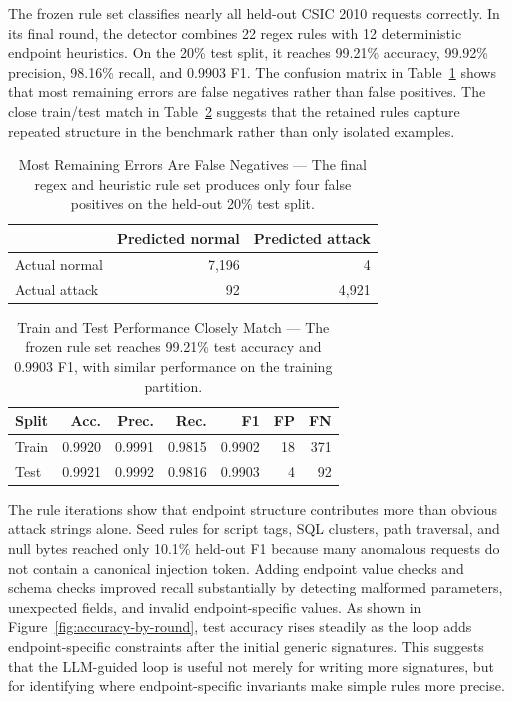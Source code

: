 \documentclass[letterpaper,twocolumn,10pt]{article}
\begin{document}
The frozen rule set classifies nearly all held-out CSIC 2010 requests correctly. In its final round, the detector combines 22 regex rules with 12 deterministic endpoint heuristics. On the 20\% test split, it reaches 99.21\% accuracy, 99.92\% precision, 98.16\% recall, and 0.9903 F1. The confusion matrix in Table~\ref{tab:regex-confusion} shows that most remaining errors are false negatives rather than false positives. The close train/test match in Table~\ref{tab:regex-train-test} suggests that the retained rules capture repeated structure in the benchmark rather than only isolated examples.

\begin{table}[t]
\centering
\begin{tabular}{lrr}
\toprule
 & Predicted normal & Predicted attack \\
\midrule
Actual normal & 7{,}196 & 4 \\
Actual attack & 92 & 4{,}921 \\
\bottomrule
\end{tabular}
\caption{Most Remaining Errors Are False Negatives --- The final regex and heuristic rule set produces only four false positives on the held-out 20\% test split.}
\label{tab:regex-confusion}
\end{table}

\begin{table}[t]
\centering
\small
\begin{tabular}{lrrrrrr}
\toprule
Split & Acc. & Prec. & Rec. & F1 & FP & FN \\
\midrule
Train & 0.9920 & 0.9991 & 0.9815 & 0.9902 & 18 & 371 \\
Test & 0.9921 & 0.9992 & 0.9816 & 0.9903 & 4 & 92 \\
\bottomrule
\end{tabular}
\caption{Train and Test Performance Closely Match --- The frozen rule set reaches 99.21\% test accuracy and 0.9903 F1, with similar performance on the training partition.}
\label{tab:regex-train-test}
\end{table}

The rule iterations show that endpoint structure contributes more than obvious attack strings alone. Seed rules for script tags, SQL clusters, path traversal, and null bytes reached only 10.1\% held-out F1 because many anomalous requests do not contain a canonical injection token. Adding endpoint value checks and schema checks improved recall substantially by detecting malformed parameters, unexpected fields, and invalid endpoint-specific values. As shown in Figure~\ref{fig:accuracy-by-round}, test accuracy rises steadily as the loop adds endpoint-specific constraints after the initial generic signatures. This suggests that the LLM-guided loop is useful not merely for writing more signatures, but for identifying where endpoint-specific invariants make simple rules more precise.
\end{document}
